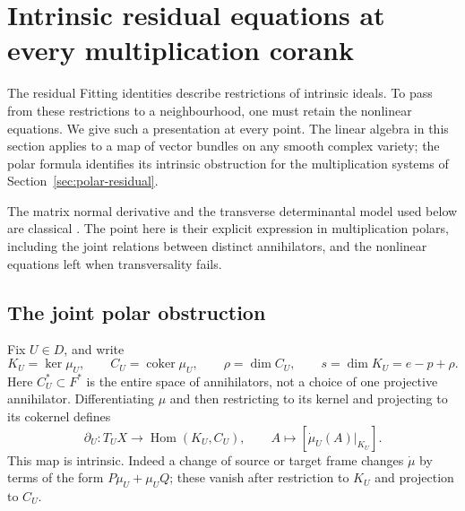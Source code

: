 \section{Intrinsic residual equations at every multiplication corank}
\label{sec:intrinsic-residual-germs}
The residual Fitting identities describe restrictions of intrinsic ideals.
To pass from these restrictions to a neighbourhood, one must retain the
nonlinear equations. We give such a presentation at every point. The
linear algebra in this section applies to a map of vector bundles on any
smooth complex variety; the polar formula identifies its intrinsic
obstruction for the multiplication systems of
Section~\ref{sec:polar-residual}.

The matrix normal derivative and the transverse determinantal model used
below are classical \cite[Remark 1.18; Section 1.3.2]{FKZ21}.
The point here is their explicit expression in multiplication polars,
including the joint relations between distinct annihilators, and the
nonlinear equations left when transversality fails.

\subsection{The joint polar obstruction}
Fix $U\in D$, and write
\[
 K_U=\ker\mu_U,\qquad C_U=\operatorname{coker}\mu_U,\qquad
 \rho=\dim C_U,\qquad s=\dim K_U=e-p+\rho.
\]
Here $C_U^*\subset F^*$ is the entire space of annihilators, not a
choice of one projective annihilator. Differentiating $\mu$ and then
restricting to its kernel and projecting to its cokernel defines
\begin{equation}\label{eq:intrinsic-rank-derivative}
 \partial_U:T_UX\longrightarrow\operatorname{Hom}(K_U,C_U),
 \qquad A\longmapsto[\dot\mu_U(A)|_{K_U}].
\end{equation}
This map is intrinsic. Indeed a change of source or target frame changes
$\dot\mu$ by terms of the form $P\mu_U+\mu_U Q$; these vanish after
restriction to $K_U$ and projection to $C_U$.


